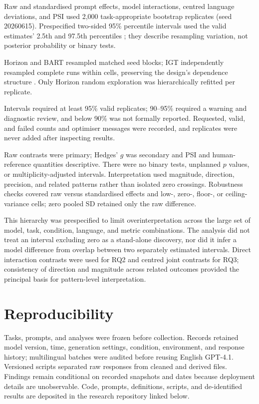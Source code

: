 \documentclass[logo,msc,inf]{infthesis}       %
\begin{document}
Raw and standardised prompt effects, model interactions, centred language deviations, and PSI used 2,000 task-appropriate bootstrap replicates (seed 20260615). Prespecified two-sided 95\% percentile intervals used the valid estimates' 2.5th and 97.5th percentiles \cite{EfronTibshirani1993Bootstrap}; they describe resampling variation, not posterior probability or binary tests.

Horizon and BART resampled matched seed blocks; IGT independently resampled complete runs within cells, preserving the design's dependence structure \cite{FieldWelsh2007ClusteredBootstrap}. Only Horizon random exploration was hierarchically refitted per replicate.

Intervals required at least 95\% valid replicates; 90--95\% required a warning and diagnostic review, and below 90\% was not formally reported. Requested, valid, and failed counts and optimiser messages were recorded, and replicates were never added after inspecting results.

Raw contrasts were primary; Hedges' $g$ was secondary and PSI and human-reference quantities descriptive. There were no binary tests, unplanned $p$ values, or multiplicity-adjusted intervals. Interpretation used magnitude, direction, precision, and related patterns rather than isolated zero crossings. Robustness checks covered raw versus standardised effects and low-, zero-, floor-, or ceiling-variance cells; zero pooled SD retained only the raw difference.

This hierarchy was prespecified to limit overinterpretation across the large set of model, task, condition, language, and metric combinations. The analysis did not treat an interval excluding zero as a stand-alone discovery, nor did it infer a model difference from overlap between two separately estimated intervals. Direct interaction contrasts were used for RQ2 and centred joint contrasts for RQ3; consistency of direction and magnitude across related outcomes provided the principal basis for pattern-level interpretation.

\section{Reproducibility}

Tasks, prompts, and analyses were frozen before collection. Records retained model version, time, generation settings, condition, environment, and response history; multilingual batches were audited before reusing English GPT-4.1. Versioned scripts separated raw responses from cleaned and derived files. Findings remain conditional on recorded snapshots and dates because deployment details are unobservable. Code, prompts, definitions, scripts, and de-identified results are deposited in the research repository linked below.
\end{document}
